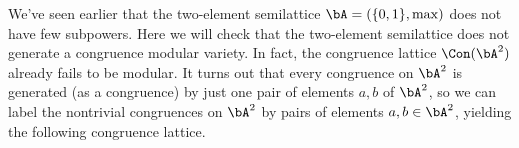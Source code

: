 \begin{ex} We've seen earlier that the two-element semilattice $\bA = (\{0,1\}, \max)$ does not have few subpowers. Here we will check that the two-element semilattice does not generate a congruence modular variety. In fact, the congruence lattice $\Con(\bA^2)$ already fails to be modular. It turns out that every congruence on $\bA^2$ is generated (as a congruence) by just one pair of elements $a,b$ of $\bA^2$, so we can label the nontrivial congruences on $\bA^2$ by pairs of elements $a,b \in \bA^2$, yielding the following congruence lattice.
\begin{center}
\end{center}
\end{ex}
